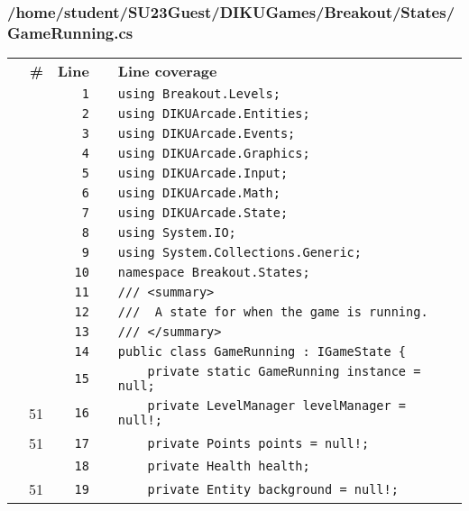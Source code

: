 \documentclass[a4paper,landscape,10pt]{article}
\begin{document}
\subsubsection{/home/student/SU23Guest/DIKUGames/Breakout/States/GameRunning.cs}
\begin{longtable}[l]{lrrll}
\textbf{} & \textbf{\#} & \textbf{Line} & \textbf{} & \textbf{Line coverage}\\
\cellcolor{gray} &  & \verb~1~ & & \verb~using Breakout.Levels;~\\
\cellcolor{gray} &  & \verb~2~ & & \verb~using DIKUArcade.Entities;~\\
\cellcolor{gray} &  & \verb~3~ & & \verb~using DIKUArcade.Events;~\\
\cellcolor{gray} &  & \verb~4~ & & \verb~using DIKUArcade.Graphics;~\\
\cellcolor{gray} &  & \verb~5~ & & \verb~using DIKUArcade.Input;~\\
\cellcolor{gray} &  & \verb~6~ & & \verb~using DIKUArcade.Math;~\\
\cellcolor{gray} &  & \verb~7~ & & \verb~using DIKUArcade.State;~\\
\cellcolor{gray} &  & \verb~8~ & & \verb~using System.IO;~\\
\cellcolor{gray} &  & \verb~9~ & & \verb~using System.Collections.Generic;~\\
\cellcolor{gray} &  & \verb~10~ & & \verb~namespace Breakout.States;~\\
\cellcolor{gray} &  & \verb~11~ & & \verb~/// <summary>~\\
\cellcolor{gray} &  & \verb~12~ & & \verb~///  A state for when the game is running.~\\
\cellcolor{gray} &  & \verb~13~ & & \verb~/// </summary>~\\
\cellcolor{gray} &  & \verb~14~ & & \verb~public class GameRunning : IGameState {~\\
\cellcolor{gray} &  & \verb~15~ & & \verb~    private static GameRunning instance = null;~\\
\cellcolor{green} & 51 & \verb~16~ & & \verb~    private LevelManager levelManager = null!;~\\
\cellcolor{green} & 51 & \verb~17~ & & \verb~    private Points points = null!;~\\
\cellcolor{gray} &  & \verb~18~ & & \verb~    private Health health;~\\
\cellcolor{green} & 51 & \verb~19~ & & \verb~    private Entity background = null!;~\\

\end{longtable}
\end{document}
